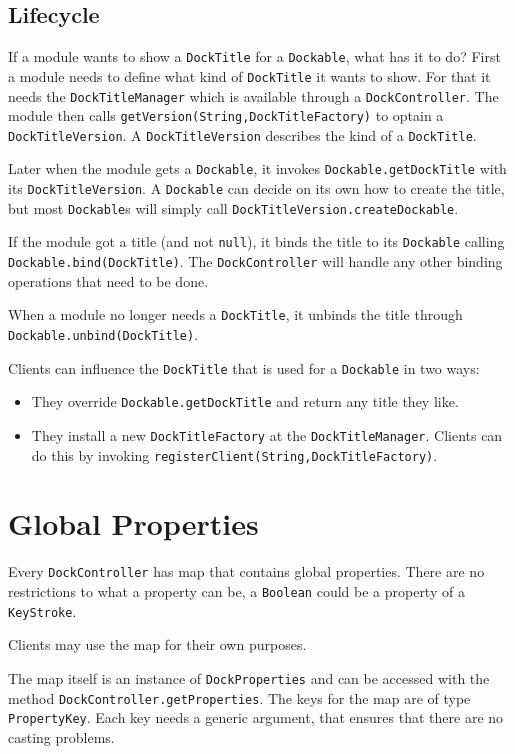 \documentclass[a4paper,10pt]{article}
\newcommand{\src}[1]{\lstinline[basicstyle=\normalsize\ttfamily,keywordstyle=\normalsize\ttfamily,identifierstyle=\normalsize\ttfamily]|#1|}
\begin{document}
\subsection{Lifecycle}
If a module wants to show a \src{DockTitle} for a \src{Dockable}, what has it to do? First a module needs to define what kind of \src{DockTitle} it wants to show. For that it needs the \src{DockTitleManager} which is available through a \src{DockController}. The module then calls \src{getVersion(String,DockTitleFactory)} to optain a \src{DockTitleVersion}. A \src{DockTitleVersion} describes the kind of a \src{DockTitle}.

Later when the module gets a \src{Dockable}, it invokes \src{Dockable.getDockTitle} with its \src{DockTitleVersion}. A \src{Dockable} can decide on its own how to create the title, but most \src{Dockable}s will simply call \src{DockTitleVersion.createDockable}.

If the module got a title (and not \src{null}), it binds the title to its \src{Dockable} calling \src{Dockable.bind(DockTitle)}. The \src{DockController} will handle any other binding operations that need to be done.

When a module no longer needs a \src{DockTitle}, it unbinds the title through \src{Dockable.unbind(DockTitle)}.

Clients can influence the \src{DockTitle} that is used for a \src{Dockable} in two ways:
\begin{itemize}
 \item They override \src{Dockable.getDockTitle} and return any title they like.
 \item They install a new \src{DockTitleFactory} at the \src{DockTitleManager}. Clients can do this by invoking \src{registerClient(String,DockTitleFactory)}.
\end{itemize}

\section{Global Properties}
Every \src{DockController} has map that contains global properties. There are no restrictions to what a property can be, a \src{Boolean} could be a property of a \src{KeyStroke}. 

Clients may use the map for their own purposes.

The map itself is an instance of \src{DockProperties} and can be accessed with the method \src{DockController.getProperties}. The keys for the map are of type \\\src{PropertyKey}. Each key needs a generic argument, that ensures that there are no casting problems.
\end{document}
